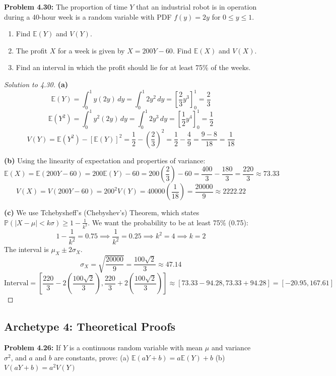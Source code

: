 \documentclass[11pt, a4paper]{article}
\theoremstyle{definition}
\theoremstyle{remark}
\newcommand{\E}{\mathbb{E}}
\newcommand{\Prob}{\mathbb{P}}
\begin{document}
\textbf{Problem 4.30:} The proportion of time $Y$ that an industrial robot is in operation during a 40-hour week is a random variable with PDF $f(y) = 2y$ for $0 \le y \le 1$.
\begin{enumerate}[label=\alph*)]
    \item Find $\E(Y)$ and $V(Y)$.
    \item The profit $X$ for a week is given by $X = 200Y - 60$. Find $\E(X)$ and $V(X)$.
    \item Find an interval in which the profit should lie for at least 75\% of the weeks.
\end{enumerate}

\begin{proof}[Solution to 4.30]
\textbf{(a)} 
\[ \E(Y) = \int_{0}^{1} y(2y) \, dy = \int_{0}^{1} 2y^2 \, dy = \left[ \frac{2}{3}y^3 \right]_{0}^{1} = \frac{2}{3} \]
\[ \E(Y^2) = \int_{0}^{1} y^2(2y) \, dy = \int_{0}^{1} 2y^3 \, dy = \left[ \frac{1}{2}y^4 \right]_{0}^{1} = \frac{1}{2} \]
\[ V(Y) = \E(Y^2) - [\E(Y)]^2 = \frac{1}{2} - \left(\frac{2}{3}\right)^2 = \frac{1}{2} - \frac{4}{9} = \frac{9 - 8}{18} = \frac{1}{18} \]

\textbf{(b)} Using the linearity of expectation and properties of variance:
\[ \E(X) = \E(200Y - 60) = 200\E(Y) - 60 = 200\left(\frac{2}{3}\right) - 60 = \frac{400}{3} - \frac{180}{3} = \frac{220}{3} \approx 73.33 \]
\[ V(X) = V(200Y - 60) = 200^2 V(Y) = 40000 \left(\frac{1}{18}\right) = \frac{20000}{9} \approx 2222.22 \]

\textbf{(c)} We use Tchebysheff's (Chebyshev's) Theorem, which states $\Prob(|X - \mu| < k\sigma) \ge 1 - \frac{1}{k^2}$.
We want the probability to be at least 75\% (0.75):
\[ 1 - \frac{1}{k^2} = 0.75 \implies \frac{1}{k^2} = 0.25 \implies k^2 = 4 \implies k = 2 \]
The interval is $\mu_X \pm 2\sigma_X$.
\[ \sigma_X = \sqrt{\frac{20000}{9}} = \frac{100\sqrt{2}}{3} \approx 47.14 \]
\[ \text{Interval} = \left[ \frac{220}{3} - 2\left(\frac{100\sqrt{2}}{3}\right), \frac{220}{3} + 2\left(\frac{100\sqrt{2}}{3}\right) \right] \approx [73.33 - 94.28, 73.33 + 94.28] = [-20.95, 167.61] \]
\end{proof}

\subsection{Archetype 4: Theoretical Proofs}

\textbf{Problem 4.26:} If $Y$ is a continuous random variable with mean $\mu$ and variance $\sigma^2$, and $a$ and $b$ are constants, prove:
(a) $\E(aY + b) = a\E(Y) + b$
(b) $V(aY + b) = a^2 V(Y)$
\end{document}
